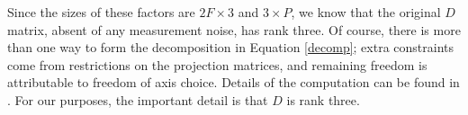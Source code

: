 Since the sizes of these factors are $2F \times 3$ and $3 \times P$, we know
that the original $D$ matrix, absent of any measurement noise, has rank three.  Of
course, there is more than one way to form the decomposition in Equation
\ref{decomp}; extra constraints come from restrictions on the projection
matrices, and remaining freedom is attributable to freedom of axis choice.
Details of the computation can be found in \cite{sfm}.  For our purposes, the
important detail is that $D$ is rank three.
